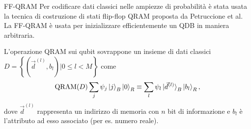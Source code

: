 \documentclass{beamer}
\begin{document}
    \begin{frame}{FF-QRAM}
        Per codificare dati classici nelle ampiezze di probabilità è stata usata la tecnica di costruzione 
        di stati flip-flop QRAM proposta da Petruccione et al. \cite{petruccione}
        La FF-QRAM è usata per inizializzare efficientemente un QDB in maniera arbitraria. 

        L'operazione QRAM sui qubit sovrappone un insieme di dati classici 
        $D = \left\{ \left( \vec{d}^{(l)}, b_l \right) \Big| 0 \leq l < M \right\}$ come
        \begin{equation*} \label{eq:qram}
            \text{QRAM}(D) \sum_j \psi_j \ket{j}_B \ket{0}_R \equiv 
            \sum_l \psi_l \ket{\vec{d}^{(l)}}_B \ket{b_l}_R,
        \end{equation*}
        dove $\vec{d}^{(l)}$ rappresenta un indirizzo di memoria con 
        $n$ bit di informazione 
        e $b_l$ è l'attributo ad esso associato (per es. numero reale). 
    \end{frame}
\end{document}
